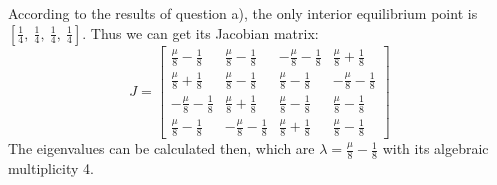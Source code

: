 \documentclass[a4 paper, 12pt]{article}
\begin{document}
 According to the results of question a), the only interior equilibrium point is $[\frac{1}{4},~ \frac{1}{4},~ \frac{1}{4},~ \frac{1}{4}]$. Thus we can get its Jacobian matrix:
\begin{equation}
        J=\left[
        \begin{array}{cccc}
           \frac{\mu}{8} - \frac{1}{8} &   \frac{\mu}{8} - \frac{1}{8}& - \frac{\mu}{8} - \frac{1}{8}&   \frac{\mu}{8} + \frac{1}{8} \\
           \frac{\mu}{8} + \frac{1}{8}&   \frac{\mu}{8} - \frac{1}{8}&   \frac{\mu}{8} - \frac{1}{8}& - \frac{\mu}{8} - \frac{1}{8} \\
         - \frac{\mu}{8} - \frac{1}{8}&   \frac{\mu}{8} + \frac{1}{8}&   \frac{\mu}{8} - \frac{1}{8}&   \frac{\mu}{8} - \frac{1}{8} \\
           \frac{\mu}{8} - \frac{1}{8}& - \frac{\mu}{8} - \frac{1}{8}&   \frac{\mu}{8} + \frac{1}{8}&   \frac{\mu}{8} - \frac{1}{8} 
        \end{array}
        \right]
\end{equation}
The eigenvalues can be calculated then, which are $\lambda = \frac{\mu}{8} - \frac{1}{8}$ with its algebraic multiplicity 4.
\end{document}

